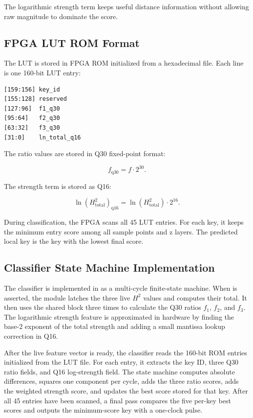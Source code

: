 The logarithmic strength term keeps useful distance information without allowing raw magnitude to dominate the score.

\subsection{FPGA LUT ROM Format}

The LUT is stored in FPGA ROM initialized from a hexadecimal  file. Each line is one 160-bit LUT entry:

\begin{lstlisting}
[159:156] key_id
[155:128] reserved
[127:96]  f1_q30
[95:64]   f2_q30
[63:32]   f3_q30
[31:0]    ln_total_q16
\end{lstlisting}

The ratio values are stored in Q30 fixed-point format:

\begin{equation}
    f_{\mathrm{q30}} = f \cdot 2^{30}.
\end{equation}

The strength term is stored as Q16:

\begin{equation}
    \ln(H_{\mathrm{total}}^2)_{\mathrm{q16}}
    = \ln(H_{\mathrm{total}}^2) \cdot 2^{16}.
\end{equation}

During classification, the FPGA scans all 45 LUT entries. For each key, it keeps the minimum entry score among all sample points and z layers. The predicted local key is the key with the lowest final score.

\subsection{Classifier State Machine Implementation}

The classifier is implemented in  as a multi-cycle finite-state machine. When  is asserted, the module latches the three live $H^2$ values and computes their total. It then uses the shared  block three times to calculate the Q30 ratios $f_1$, $f_2$, and $f_3$. The logarithmic strength feature is approximated in hardware by finding the base-2 exponent of the total strength and adding a small mantissa lookup correction in Q16.

After the live feature vector is ready, the classifier reads the 160-bit ROM entries initialized from the  LUT file. For each entry, it extracts the key ID, three Q30 ratio fields, and Q16 log-strength field. The state machine computes absolute differences, squares one component per cycle, adds the three ratio scores, adds the weighted strength score, and updates the best score stored for that key. After all 45 entries have been scanned, a final pass compares the five per-key best scores and outputs the minimum-score key with a one-clock  pulse.
